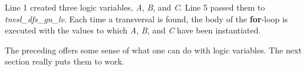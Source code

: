 Line 1 created three logic variables,  \textit{A}, \textit{B}, and \textit{C}. Line 5 passed them to \textit{tnvsl\_dfs\_gn\_lv}. Each time a transversal is found, the body of the \textbf{for}-loop is executed with the values to which \textit{A}, \textit{B}, and \textit{C} have been instantiated. 

The preceding offers some sense of what one can do with logic variables. The next section really puts them to work.
